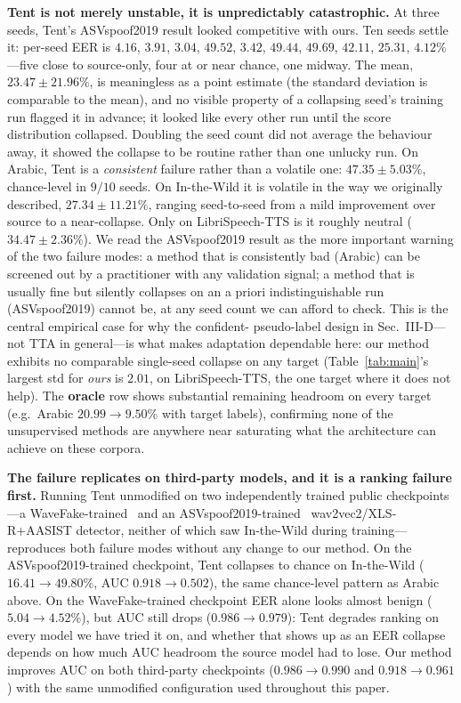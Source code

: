 \documentclass[conference]{IEEEtran}
\begin{document}
\textbf{Tent is not merely unstable, it is unpredictably catastrophic.} At
three seeds, Tent's ASVspoof2019 result looked competitive with ours. Ten
seeds settle it: per-seed EER is $4.16$, $3.91$, $3.04$, $49.52$, $3.42$,
$49.44$, $49.69$, $42.11$, $25.31$, $4.12\%$---five close to source-only, four
at or near chance, one midway. The mean, $23.47\!\pm\!21.96\%$, is meaningless
as a point estimate (the standard deviation is comparable to the mean), and no
visible property of a collapsing seed's training run flagged it in advance; it
looked like every other run until the score distribution collapsed. Doubling
the seed count did not average the behaviour away, it showed the collapse to be
routine rather than one unlucky run. On Arabic, Tent is a \emph{consistent}
failure rather than a volatile one: $47.35\!\pm\!5.03\%$, chance-level in
$9/10$ seeds. On In-the-Wild it is volatile in the way we originally described,
$27.34\!\pm\!11.21\%$, ranging seed-to-seed from a mild improvement over
source to a near-collapse. Only on LibriSpeech-TTS is it roughly neutral
($34.47\!\pm\!2.36\%$). We read the ASVspoof2019 result as the more important
warning of the two failure modes: a method that is consistently bad
(Arabic) can be screened out by a practitioner with any validation signal;
a method that is usually fine but silently collapses on an a priori
indistinguishable run (ASVspoof2019) cannot be, at any seed count we can
afford to check. This is the central empirical case for why the confident-
pseudo-label design in Sec.~III-D---not TTA in general---is what makes
adaptation dependable here: our method exhibits no comparable single-seed
collapse on any target (Table~\ref{tab:main}'s largest std for \emph{ours} is
$2.01$, on LibriSpeech-TTS, the one target where it does not help). The
\textbf{oracle} row shows substantial remaining headroom on every target
(e.g.\ Arabic $20.99\!\to\!9.50\%$ with target labels), confirming none of the
unsupervised methods are anywhere near saturating what the architecture can
achieve on these corpora.

\textbf{The failure replicates on third-party models, and it is a ranking
failure first.} Running Tent unmodified on two independently trained public
checkpoints---a WaveFake-trained~\cite{shiftyspeech} and an
ASVspoof2019-trained~\cite{deepfensehf} wav2vec2/XLS-R+AASIST
detector, neither of which saw In-the-Wild during training---reproduces both
failure modes without any change to our method. On the ASVspoof2019-trained
checkpoint, Tent collapses to chance on In-the-Wild ($16.41\!\to\!49.80\%$,
AUC $0.918\!\to\!0.502$), the same chance-level pattern as Arabic above. On the
WaveFake-trained checkpoint EER alone looks almost benign
($5.04\!\to\!4.52\%$), but AUC still drops ($0.986\!\to\!0.979$): Tent degrades
ranking on every model we have tried it on, and whether that shows up as an
EER collapse depends on how much AUC headroom the source model had to lose.
Our method improves AUC on both third-party checkpoints
($0.986\!\to\!0.990$ and $0.918\!\to\!0.961$) with the same unmodified
configuration used throughout this paper.
\end{document}

